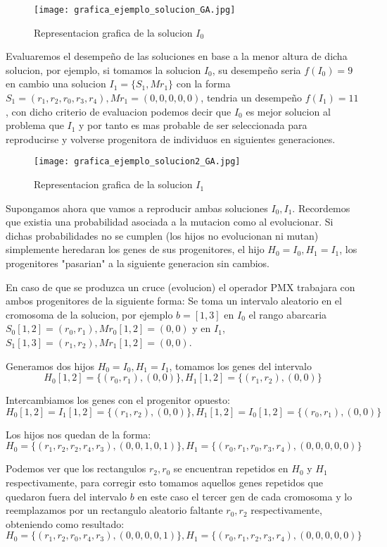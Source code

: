 \documentclass[10pt]{article}
\begin{document}
\begin{figure}[H]
\centerline{\texttt{[image: grafica\_ejemplo\_solucion\_GA.jpg]}}
\caption{Representacion grafica de la solucion $I_0$}
\label{fig_1}
\end{figure}

Evaluaremos el desempeño de las soluciones en base a la menor altura de dicha solucion, por ejemplo, si tomamos la solucion $I_0$, su desempeño seria $f(I_0) = 9$ en cambio una solucion $I_1 = \{S_1,Mr_1\}$ con la forma $S_1 = (r_1,r_2,r_0,r_3,r_4), Mr_1 = (0,0,0,0,0)$, tendria un desempeño $f(I_1) = 11$, con dicho criterio de evaluacion podemos decir que $I_0$ es mejor solucion al problema que $I_1$ y por tanto es mas probable de ser seleccionada para reproducirse y volverse progenitora de individuos en siguientes generaciones.

\begin{figure}[H]
\centerline{\texttt{[image: grafica\_ejemplo\_solucion2\_GA.jpg]}}
\caption{Representacion grafica de la solucion $I_1$}
\label{fig_2}
\end{figure}

Supongamos ahora que vamos a reproducir ambas soluciones $I_0,I_1$. Recordemos que existia una probabilidad asociada a la mutacion como al evolucionar. Si dichas probabilidades no se cumplen (los hijos no evolucionan ni mutan) simplemente heredaran los genes de sus progenitores, el hijo $H_0 = I_0, H_1 = I_1$, los progenitores "pasarian" a la siguiente generacion sin cambios.

En caso de que se produzca un cruce (evolucion) el operador PMX trabajara con ambos progenitores de la siguiente forma: 
Se toma un intervalo aleatorio en el cromosoma de la solucion, por ejemplo $b = [1,3]$ en $I_0$ el rango abarcaria $S_0[1,2] = (r_0,r_1), Mr_0[1,2] = (0,0)$ y en $I_1$, $S_1[1,3] = (r_1,r_2), Mr_1[1,2] = (0,0)$.

Generamos dos hijos $H_0 = I_0, H_1 = I_1$, tomamos los genes del intervalo
$$H_0[1,2] = \{(r_0,r_1),(0,0)\}, H_1[1,2] = \{(r_1,r_2),(0,0)\}$$

Intercambiamos los genes con el progenitor opuesto:
$$H_0[1,2] = I_1[1,2] = \{(r_1,r_2),(0,0)\}, H_1[1,2] = I_0[1,2] = \{(r_0,r_1),(0,0)\}$$ 

Los hijos nos quedan de la forma: 
$$H_0=\{(r_1,r_2,r_2,r_4,r_3),(0,0,1,0,1)\}, H_1 = \{(r_0,r_1,r_0,r_3,r_4),(0,0,0,0,0)\}$$

Podemos ver que los rectangulos $r_2, r_0$ se encuentran repetidos en $H_0$ y $H_1$ respectivamente, para corregir esto tomamos aquellos genes repetidos que quedaron fuera del intervalo $b$ en este caso el tercer gen de cada cromosoma y lo reemplazamos por un rectangulo aleatorio faltante $r_0, r_2$ respectivamente, obteniendo como resultado:
$$H_0=\{(r_1,r_2,r_0,r_4,r_3),(0,0,0,0,1)\}, H_1 = \{(r_0,r_1,r_2,r_3,r_4),(0,0,0,0,0)\}$$
\end{document}
